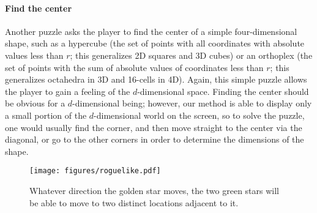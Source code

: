 \documentclass{article}
\begin{document}
\paragraph{Find the center} 
Another puzzle asks the player to find the center of a simple four-dimensional shape, such as a hypercube (the set of points with all
coordinates with absolute values less than $r$; this generalizes 2D squares and 3D cubes) or an orthoplex (the set of points with the sum of
absolute values of coordinates less than $r$; this generalizes octahedra in 3D and 16-cells in 4D). Again, this simple puzzle 
allows the player to gain a feeling of the $d$-dimensional space. Finding the center should be obvious for a $d$-dimensional
being; however, our method is able to display only a small portion of the $d$-dimensional world on the screen, so to solve the 
puzzle, one would usually find the corner, and then move straight to the center via the diagonal, or go to the other corners
in order to determine the dimensions of the shape.

\begin{figure}
\texttt{[image: figures/roguelike.pdf]}
\caption{Whatever direction the golden star moves, the two green stars will be able to move to two distinct locations
adjacent to it.\label{rlpic}}
\end{figure}
\end{document}
